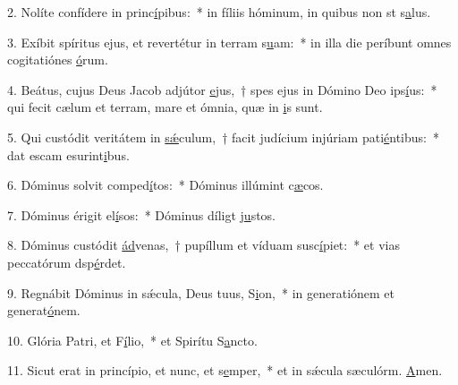 2. Nolíte confídere in princ\uline{í}pibus:~* in fíliis hóminum, in quibus non st s\uline{a}lus.\par 
3. Exíbit spíritus ejus, et revertétur in terram s\uline{u}am:~* in illa die períbunt omnes cogitatiónes \uline{ó}rum.\par 
4. Beátus, cujus Deus Jacob adjútor \uline{e}jus,~† spes ejus in Dómino Deo ips\uline{í}us:~* qui fecit cælum et terram, mare et ómnia, quæ in \uline{i}s sunt.\par 
5. Qui custódit veritátem in \uline{sǽ}culum,~† facit judícium injúriam pati\uline{é}ntibus:~* dat escam esurint\uline{i}bus.\par 
6. Dóminus solvit comped\uline{í}tos:~* Dóminus illúmint c\uline{æ}cos.\par 
7. Dóminus érigit el\uline{í}sos:~* Dóminus díligt j\uline{u}stos.\par 
8. Dóminus custódit \uline{ád}venas,~† pupíllum et víduam susc\uline{í}piet:~* et vias peccatórum dsp\uline{é}rdet.\par 
9. Regnábit Dóminus in sǽcula, Deus tuus, S\uline{i}on,~* in generatiónem et generat\uline{ó}nem.\par 
10. Glória Patri, et F\uline{í}lio,~* et Spirítu S\uline{a}ncto.\par 
11. Sicut erat in princípio, et nunc, et s\uline{e}mper,~* et in sǽcula sæculórm. \uline{A}men.\par 
